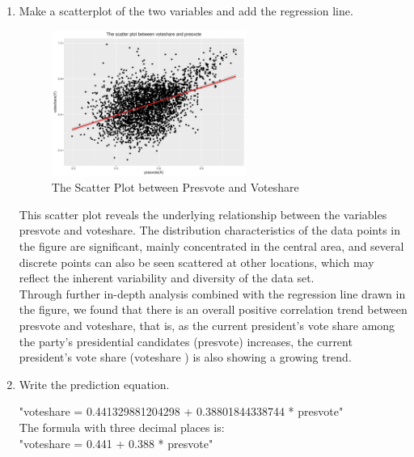 \documentclass[12pt,letterpaper]{article}
\begin{document}
\begin{enumerate}
		\item Make a scatterplot of the two variables and add the regression line. 
		\vspace{1cm}
		
		
		\begin{figure}[h!]
			\caption{\footnotesize{The Scatter Plot between Presvote and Voteshare}}
			\vspace{.5cm}
			\centering
			\label{fig:3.2}
			\includegraphics[width=0.6\textwidth]{voteshare_presvote_scatterplot.pdf}
		\end{figure}
		
		    \vspace{5cm}		
		    
		This scatter plot reveals the underlying relationship between the variables presvote and voteshare. The distribution characteristics of the data points in the figure are significant, mainly concentrated in the central area, and several discrete points can also be seen scattered at other locations, which may reflect the inherent variability and diversity of the data set.\\
		Through further in-depth analysis combined with the regression line drawn in the figure, we found that there is an overall positive correlation trend between presvote and voteshare, that is, as the current president’s vote share among the party’s presidential candidates (presvote) increases, the current president’s vote share (voteshare ) is also showing a growing trend.\\

			
		\item Write the prediction equation.
		
		"voteshare = 0.441329881204298 + 0.38801844338744 * presvote"\\
		The formula with three decimal places is:\\
		"voteshare = 0.441 + 0.388 * presvote"\\
	\end{enumerate}
	
\end{document}

